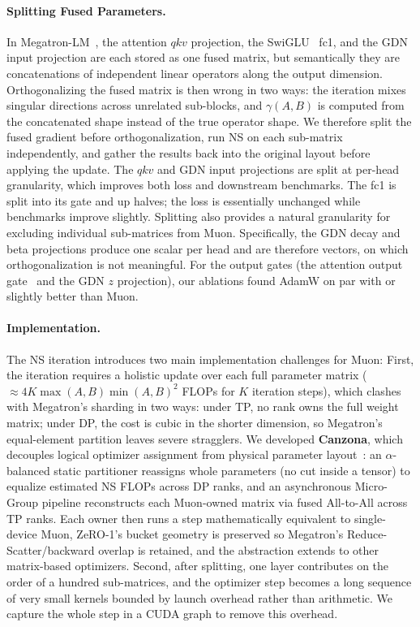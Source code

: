 \paragraph{Splitting Fused Parameters.}
\label{sec:optimizer-split}
In Megatron-LM~\citep{shoeybi2019megatron}, the attention $qkv$ projection, the SwiGLU~\citep{shazeer2020glu} fc1, and the GDN input projection are each stored as one fused matrix, but semantically they are concatenations of independent linear operators along the output dimension.
Orthogonalizing the fused matrix is then wrong in two ways: the iteration mixes singular directions across unrelated sub-blocks, and $\gamma(A,B)$ is computed from the concatenated shape instead of the true operator shape.
We therefore split the fused gradient before orthogonalization, run NS on each sub-matrix independently, and gather the results back into the original layout before applying the update.
The $qkv$ and GDN input projections are split at per-head granularity, which improves both loss and downstream benchmarks. 
The fc1 is split into its gate and up halves; the loss is essentially unchanged while benchmarks improve slightly.
Splitting also provides a natural granularity for excluding individual sub-matrices from Muon.
Specifically, the GDN decay and beta projections produce one scalar per head and are therefore vectors, on which orthogonalization is not meaningful. 
For the output gates (the attention output gate~\citep{qiu2025gated} and the GDN $z$ projection), our ablations found AdamW on par with or slightly better than Muon.

\paragraph{Implementation.}
\label{sec:optimizer-impl}
The NS iteration introduces two main implementation challenges for Muon:
First, the iteration requires a holistic update over each full parameter matrix ($\approx 4K\max(A,B)\min(A,B)^2$ FLOPs for $K$ iteration steps), which clashes with Megatron's sharding in two ways: under TP, no rank owns the full weight matrix; under DP, the cost is cubic in the shorter dimension, so Megatron's equal-element partition leaves severe stragglers. We developed \textbf{Canzona}, which decouples logical optimizer assignment from physical parameter layout~\citep{wang2026canzonaunifiedasynchronousloadbalanced}: an $\alpha$-balanced static partitioner reassigns whole parameters (no cut inside a tensor) to equalize estimated NS FLOPs across DP ranks, and an asynchronous Micro-Group pipeline reconstructs each Muon-owned matrix via fused All-to-All across TP ranks. 
Each owner then runs a step mathematically equivalent to single-device Muon, ZeRO-1's bucket geometry is preserved so Megatron's Reduce-Scatter/backward overlap is retained, and the abstraction extends to other matrix-based optimizers.
Second, after splitting, one layer contributes on the order of a hundred sub-matrices, and the optimizer step becomes a long sequence of very small kernels bounded by launch overhead rather than arithmetic. 
We capture the whole step in a CUDA graph to remove this overhead.